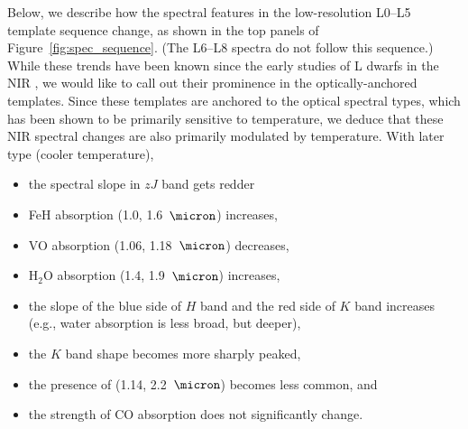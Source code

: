 \documentclass[12pt,preprint]{aastex}
\begin{document}

Below, we describe how the spectral features in the low-resolution L0--L5 template sequence change, as shown in the top panels of Figure~\ref{fig:spec_sequence}. (The L6--L8 spectra do not follow this sequence.)
While these trends have been known since the early studies of L dwarfs in the NIR \citep{Testi01,Reid01_NIR,Geballe02}, we would like to call out their prominence in the optically-anchored templates.
Since these templates are anchored to the optical spectral types, which has been shown to be primarily sensitive to temperature, we deduce that these NIR spectral changes are also primarily modulated by temperature.
With later type (cooler temperature), 
\begin{itemize}
\item the spectral slope in $zJ$ band gets redder 
\item FeH absorption (1.0, 1.6~$\micron$) increases,
\item VO absorption (1.06, 1.18~$\micron$) decreases,
\item H$_2$O absorption (1.4, 1.9~$\micron$) increases,
\item the slope of the blue side of $H$ band and the red side of $K$ band increases (e.g., water absorption is less broad, but deeper), 
\item the $K$ band shape becomes more sharply peaked,
\item the presence of  (1.14, 2.2~$\micron$) becomes less common, and
\item the strength of CO absorption does not significantly change.
\end{itemize}
\end{document}

